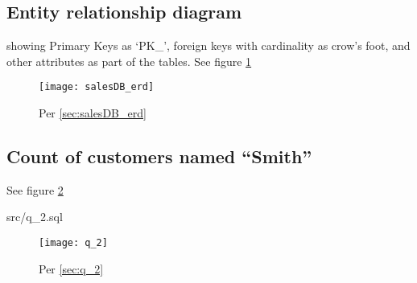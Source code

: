 \documentclass{article}
\begin{document}
\subsection{Entity relationship diagram} showing Primary Keys as `PK\_', foreign
keys with cardinality as crow's foot, and other attributes as part of the
tables. See figure \ref{fig:salesDB_erd}
\label{sec:salesDB_erd}
\begin{figure}[H]\centering
	\caption{Per \ref{sec:salesDB_erd}}
	\texttt{[image: salesDB\_erd]}
	\label{fig:salesDB_erd}
\end{figure}

\subsection{Count of customers named ``Smith''}
See figure \ref{fig:q_2}
\label{sec:q_2}
\begin{lstinputlisting}[float]{src/q_2.sql}
\end{lstinputlisting}
\begin{figure}[H]\centering
	\caption{Per \ref{sec:q_2}}
	\texttt{[image: q\_2]}
	\label{fig:q_2}
\end{figure}
\end{document}
